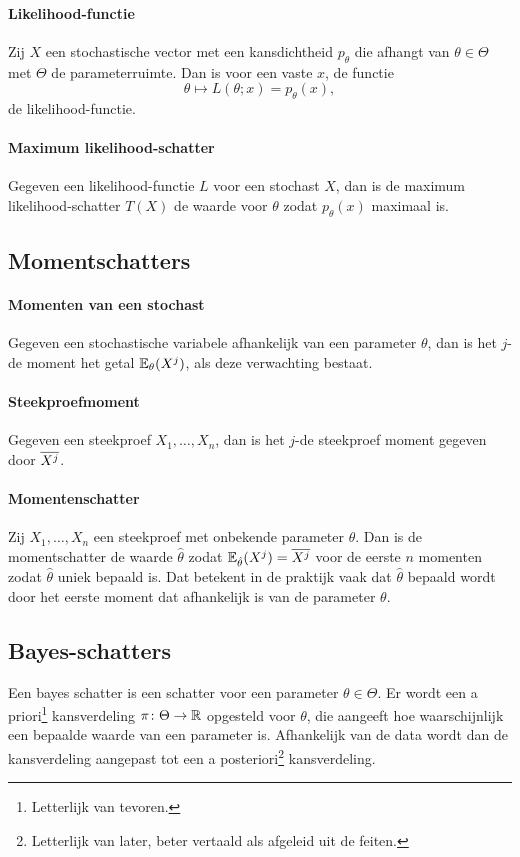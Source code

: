 \paragraph{Likelihood-functie} Zij \(X\) een stochastische vector met een kansdichtheid \(p_{\theta}\) die afhangt van \(\theta\in\Theta\) met \(\Theta\) de parameterruimte. Dan is voor een vaste \(x\), de functie
\[
    \theta\mapsto L(\theta;x)=p_{\theta}(x),
\]
de likelihood-functie.

\paragraph{Maximum likelihood-schatter} Gegeven een likelihood-functie \(L\) voor een stochast \(X\), dan is de maximum likelihood-schatter \(T(X)\) de waarde voor \(\theta\) zodat \(p_{\theta}(x)\) maximaal is.

\subsection{Momentschatters}
\paragraph{Momenten van een stochast} Gegeven een stochastische variabele afhankelijk van een parameter \(\theta\), dan is het \(j\)-de moment het getal \(\mathbb{E}_{\theta}(X^{j})\), als deze verwachting bestaat.

\paragraph{Steekproefmoment} Gegeven een steekproef \(X_{1},\dots,X_{n}\), dan is het \(j\)-de steekproef moment gegeven door \(\overline{X^{j}}\).

\paragraph{Momentenschatter} Zij \(X_{1},\dots,X_{n}\) een steekproef met onbekende parameter \(\theta\). Dan is de momentschatter de waarde \(\hat{\theta}\) zodat \(\mathbb{E}_{\hat{\theta}}(X^{j})=\overline{X^{j}}\) voor de eerste \(n\) momenten zodat \(\hat{\theta}\) uniek bepaald is. Dat betekent in de praktijk vaak dat \(\hat{\theta}\) bepaald wordt door het eerste moment dat afhankelijk is van de parameter \(\theta\).

\subsection{Bayes-schatters}
Een bayes schatter is een schatter voor een parameter \(\theta\in\Theta\). Er wordt een a priori\footnote{Letterlijk van tevoren.} kansverdeling \(\pi\colon\Theta\to\mathbb{R}\) opgesteld voor \(\theta\), die aangeeft hoe waarschijnlijk een bepaalde waarde van een parameter is. Afhankelijk van de data wordt dan de kansverdeling aangepast tot een a posteriori\footnote{Letterlijk van later, beter vertaald als afgeleid uit de feiten.} kansverdeling.

